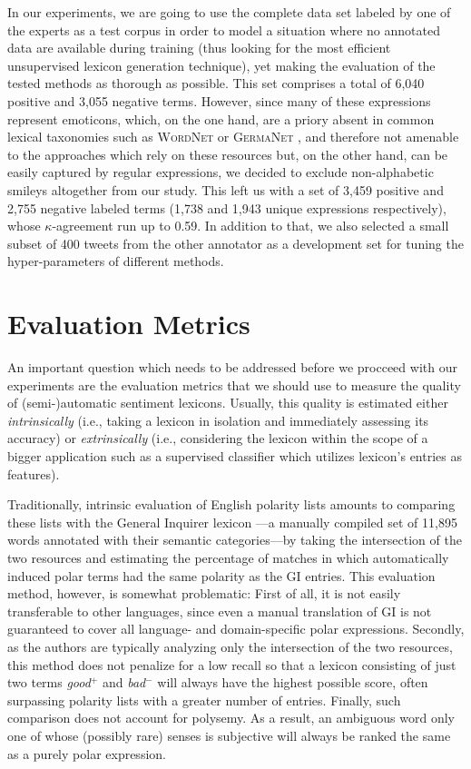 In our experiments, we are going to use the complete data set labeled
by one of the experts as a test corpus in order to model a situation
where no annotated data are available during training (thus looking
for the most efficient unsupervised lexicon generation technique), yet
making the evaluation of the tested methods as thorough as possible.
This set comprises a total of 6,040 positive and 3,055 negative terms.
However, since many of these expressions represent emoticons, which,
on the one hand, are a priory absent in common lexical taxonomies such
as \textsc{WordNet} \cite{Miller:95,Miller:07} or \textsc{GermaNet}
\cite{Hamp:97}, and therefore not amenable to the approaches which
rely on these resources but, on the other hand, can be easily captured
by regular expressions, we decided to exclude non-alphabetic smileys
altogether from our study.  This left us with a set of 3,459 positive
and 2,755 negative labeled terms (1,738 and 1,943 unique expressions
respectively), whose $\kappa$-agreement run up to 0.59.  In addition
to that, we also selected a small subset of 400 tweets from the other
annotator as a development set for tuning the hyper-parameters of
different methods.

\section{Evaluation Metrics}\label{subsec:snt-lex:eval-metrics}

An important question which needs to be addressed before we procceed
with our experiments are the evaluation metrics that we should use to
measure the quality of (semi-)automatic sentiment lexicons.  Usually,
this quality is estimated either \textit{intrinsically} (i.e., taking
a lexicon in isolation and immediately assessing its accuracy) or
\textit{extrinsically} (i.e., considering the lexicon within the scope
of a bigger application such as a supervised classifier which utilizes
lexicon's entries as features).

Traditionally, intrinsic evaluation of English polarity lists amounts
to comparing these lists with the General Inquirer lexicon \cite[GI;
][]{Stone:66}---a manually compiled set of 11,895 words annotated with
their semantic categories---by taking the intersection of the two
resources and estimating the percentage of matches in which
automatically induced polar terms had the same polarity as the GI
entries.  This evaluation method, however, is somewhat problematic:
First of all, it is not easily transferable to other languages, since
even a manual translation of GI is not guaranteed to cover all
language- and domain-specific polar expressions.  Secondly, as the
authors are typically analyzing only the intersection of the two
resources, this method does not penalize for a low recall so that a
lexicon consisting of just two terms \textit{good}$^+$ and
\textit{bad}$^-$ will always have the highest possible score, often
surpassing polarity lists with a greater number of entries.  Finally,
such comparison does not account for polysemy.  As a result, an
ambiguous word only one of whose (possibly rare) senses is subjective
will always be ranked the same as a purely polar expression.

